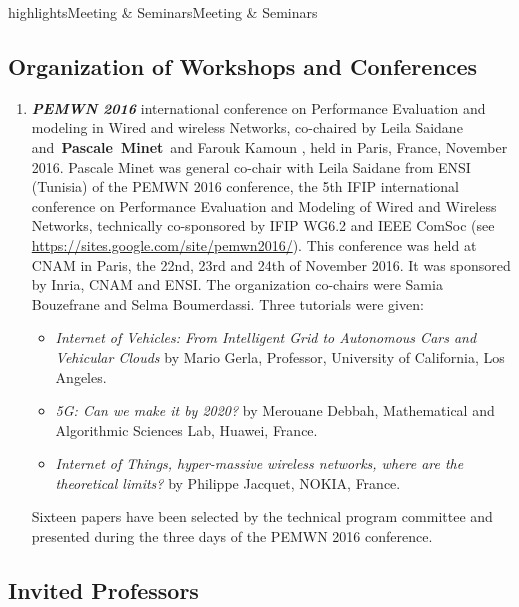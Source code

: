 \documentclass{ra2016}
\newcommand{\pascale}          {\textbf{Pascale~Minet}}
\begin{document}
\begin{module}{highlights}{Meeting \& Seminars}{Meeting \& Seminars}
\subsection{Organization of Workshops and Conferences}

\begin{enumerate}
    \item \textit{\textbf{PEMWN 2016}}
        international conference on Performance Evaluation and modeling in Wired and wireless Networks, co-chaired by Leila Saidane and~\pascale~and Farouk Kamoun , held in Paris, France, November 2016.
        Pascale Minet was general co-chair with Leila Saidane from ENSI (Tunisia) of the PEMWN 2016 conference, the 5th IFIP international conference on Performance Evaluation and Modeling of Wired and Wireless Networks, technically co-sponsored by IFIP WG6.2 and IEEE ComSoc (see \url{https://sites.google.com/site/pemwn2016/}).
        This conference was held  at CNAM in Paris, the 22nd, 23rd and 24th of November 2016.
        It was sponsored by Inria, CNAM and ENSI.
        The organization co-chairs were Samia Bouzefrane and Selma Boumerdassi.
        Three tutorials were given:
        \begin{itemize}
            \item \emph{Internet of Vehicles: From Intelligent Grid to Autonomous Cars and Vehicular Clouds} by Mario Gerla, Professor, University of California, Los Angeles.
            \item \emph{5G: Can we make it by 2020?} by  Merouane Debbah,  Mathematical and Algorithmic Sciences Lab, Huawei, France.
            \item \emph{ Internet of Things, hyper-massive wireless networks, where are the theoretical limits?} by Philippe Jacquet, NOKIA, France.
        \end{itemize}
        Sixteen papers have been selected by the technical program committee and presented during the three days of the PEMWN 2016 conference.\\
\end{enumerate}

\subsection{Invited Professors}


\end{module}
\end{document}
